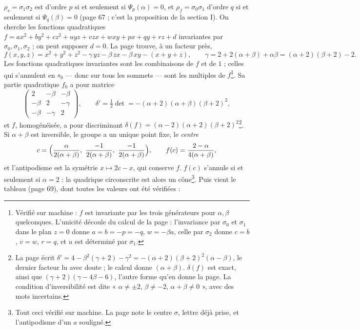 \documentclass[11pt,a4paper]{article}
\begin{document}
$\rho_s = \sigma_1\sigma_2$ est d'ordre $p$ si et seulement si $\Psi_p(\alpha) =
0$, et $\rho_f = \sigma_0\sigma_1$ d'ordre $q$ si et seulement si $\Psi_q(\beta) =
0$ (page 67 ; c'est la proposition de la section I). On cherche les fonctions
quadratiques $f = ax^2 + by^2 + cz^2 + uyz + vzx + wxy + px + qy + rz + d$
invariantes par $\sigma_0, \sigma_1, \sigma_2$ ; on peut supposer $d = 0$. La
page trouve, à un facteur près,
\[
f(x, y, z) = x^2 + y^2 + z^2 - \gamma\, yz - \beta\, zx - \beta\, xy - (x + y + z),
\qquad \gamma = 2 + 2(\alpha + \beta) + \alpha\beta = (\alpha + 2)(\beta + 2) - 2 .
\]
Les fonctions quadratiques invariantes sont les combinaisons de $f$ et de $1$ ;
celles qui s'annulent en $s_0$ --- donc sur tous les sommets --- sont les
multiples de $f$\footnote{Vérifié sur machine : $f$ est invariante par les trois
générateurs pour $\alpha, \beta$ quelconques. L'unicité découle du calcul de
la page : l'invariance par $\sigma_0$ et $\sigma_1$ dans le plan $z = 0$ donne
$a = b = -p = -q$, $w = -\beta a$, celle par $\sigma_2$ donne $c = b$, $v = w$,
$r = q$, et $u$ est déterminé par $\sigma_1$.}. Sa partie quadratique $f_0$ a
pour matrice
\[
\begin{pmatrix} 2 & -\beta & -\beta \\ -\beta & 2 & -\gamma \\ -\beta & -\gamma & 2
\end{pmatrix}, \qquad
\delta' = \tfrac12 \det = -(\alpha + 2)(\alpha + \beta)(\beta + 2)^2 ,
\]
et $f$, homogénéisée, a pour discriminant $\delta(f) = (\alpha - 2)(\alpha +
2)(\beta + 2)^2$\footnote{La page écrit $\delta' = 4 - \beta^2(\gamma + 2) -
\gamma^2 = -(\alpha + 2)(\beta + 2)^2(\alpha - \beta)$, le dernier facteur lu avec
doute ; le calcul donne $(\alpha + \beta)$. $\delta(f)$ est exact, ainsi que
$(\gamma + 2)(\gamma - 4\beta - 6)$, l'autre forme qu'en donne la page. La
condition d'inversibilité est dite « $\alpha \neq \pm 2$, $\beta \neq -2$,
$\alpha + \beta \neq 0$ », avec des mots incertains.}. Si $\alpha + \beta$ est
inversible, le groupe a un unique point fixe, le \emph{centre}
\[
c = \Bigl(\frac{\alpha}{2(\alpha + \beta)},\ \frac{-1}{2(\alpha + \beta)},\
\frac{-1}{2(\alpha + \beta)}\Bigr), \qquad f(c) = \frac{2 - \alpha}{4(\alpha + \beta)} ,
\]
et l'antipodisme est la symétrie $x \mapsto 2c - x$, qui conserve $f$. $f(c)$
s'annule si et seulement si $\alpha = 2$ : la quadrique circonscrite est alors
un cône\footnote{Tout ceci vérifié sur machine. La page note le centre
$\sigma$, lettre déjà prise, et l'antipodisme d'un $a$ souligné.}. Puis vient
le tableau (page 69), dont toutes les valeurs ont été vérifiées :
\end{document}
